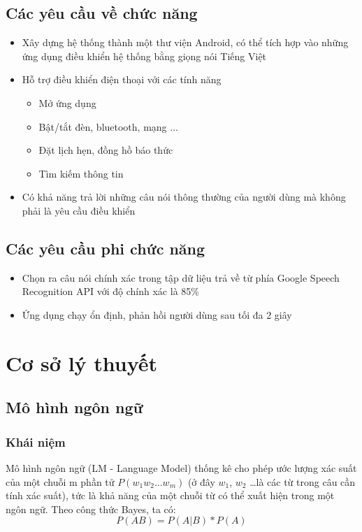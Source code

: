 \documentclass[12pt]{report}
\begin{document}
\section{Các yêu cầu về chức năng} \label{sec:requirement}
\begin{itemize}
	\item Xây dựng hệ thống thành một thư viện Android, có thể tích hợp vào những ứng dụng điều khiển hệ thống bằng giọng nói Tiếng Việt
	\item Hỗ trợ điều khiển điện thoại với các tính năng
	\begin{itemize}
		\item Mở ứng dụng
		\item Bật/tắt đèn, bluetooth, mạng ...
		\item Đặt lịch hẹn, đồng hồ báo thức
		\item Tìm kiếm thông tin
	\end{itemize}
	\item Có khả năng trả lời những câu nói thông thường của người dùng mà không phải là yêu cầu điều khiển
\end{itemize}

\section{Các yêu cầu phi chức năng}
\begin{itemize}
	\item Chọn ra câu nói chính xác trong tập dữ liệu trả về từ phía Google Speech Recognition API với độ chính xác là 85\%
	\item Ứng dụng chạy ổn định, phản hồi người dùng sau tối đa 2 giây
\end{itemize}

\chapter{Cơ sở lý thuyết}
\section{Mô hình ngôn ngữ}
\subsection{Khái niệm}
Mô hình ngôn ngữ (LM - Language Model) thống kê cho phép ước lượng xác suất của một chuỗi m phần tử $P(w_1 w_2 \ldots w_m)$ (ở đây $w_1$, $w_2$ \ldots  là các từ trong câu cần tính xác suất), tức là khả năng của một chuỗi từ có thể xuất hiện trong một ngôn ngữ. Theo công thức Bayes, ta có:
\[P(AB)=P(A|B)*P(A)\]
\end{document}
